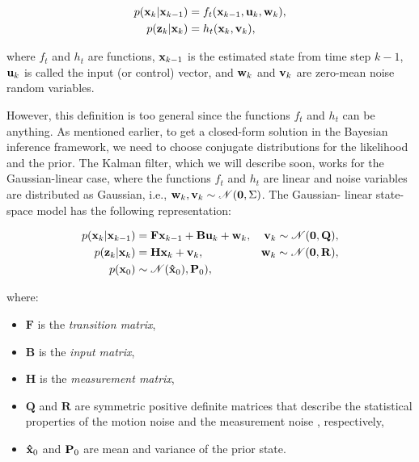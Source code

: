 $$
\begin{aligned}
    p(\vecat{x}{k} | \vecat{x}{k-1}) 
        &= f_t(\vecat{x}{k-1}, \vecat{u}{k}, \vecat{w}{k}), \\
    p(\vecat{z}{k} | \vecat{x}{k}) 
        &= h_t(\vecat{x}{k}, \vecat{v}{k}),
\end{aligned}
$$

where $f_t$ and $h_t$ are functions, $\vecat{x}{k-1}$ is the estimated state 
from time step $k-1$, $\vecat{u}{k}$ is called the input (or control) vector, 
and $\vecat{w}{k}$ and $\vecat{v}{k}$ are zero-mean noise random variables.

However, this definition is too general since the functions $f_t$ and $h_t$ can 
be anything. As mentioned earlier, to get a closed-form solution in the 
Bayesian inference framework, we need to choose conjugate distributions for the 
likelihood and the prior. The Kalman filter, which we will describe soon, works 
for the Gaussian-linear case, where the functions $f_t$ and $h_t$ are linear 
and noise variables are distributed as Gaussian, i.e., 
$\vecat{w}{k}, \vecat{v}{k} \sim \mathscr{N}(\mathbf{0}, \Sigma)$. The Gaussian-
linear state-space model has the following representation:

$$
\begin{aligned}
    p(\vecat{x}{k} | \vecat{x}{k-1}) 
        &= \mathbf{F} \vecat{x}{k-1}
            + \mathbf{B} \vecat{u}{k}
            + \vecat{w}{k},
        & \vecat{v}{k} \sim \mathscr{N}(\mathbf{0}, \mathbf{Q}), \\
    p(\vecat{z}{k} | \vecat{x}{k})
        &= \mathbf{H} \vecat{x}{k} + \vecat{v}{k},
        & \vecat{w}{k} \sim \mathscr{N}(\mathbf{0}, \mathbf{R}), \\
    p(\vecat{x}{0}) &\sim \mathscr{N}(\vecat{\hat{x}}{0}), \vecat{P}{0}),&
\end{aligned}
$$

where:

\begin{itemize}
    \item $\mathbf{F}$ is the \textit{transition matrix},
    \item $\mathbf{B}$ is the \textit{input matrix},
    \item $\mathbf{H}$ is the \textit{measurement matrix},
    \item $\mathbf{Q}$ and $\mathbf{R}$ are symmetric positive definite matrices
        that describe the statistical properties of the motion noise
         and the measurement noise , respectively,
    \item $\vecat{\hat x}{0}$ and $\vecat{P}{0}$ are mean and variance of the 
    prior state.
\end{itemize}

